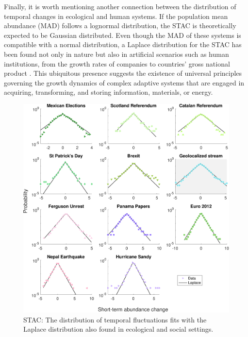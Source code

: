 Finally, it is worth mentioning another connection between the distribution of temporal changes in ecological and human systems. If the population mean abundance (MAD) follows a lognormal distribution, the STAC is theoretically expected to be Gaussian distributed. Even though the MAD of these systems is compatible with a normal distribution, a Laplace distribution for the STAC has been found not only in nature but also in artificial scenarios such as human institutions, from the growth rates of companies to countries’ gross national
product \cite{marquet2005scaling}. This ubiquitous presence suggests the existence of universal principles governing the growth dynamics of complex adaptive systems that are engaged in acquiring, transforming, and storing information, materials, or energy. \\


\begin{figure}[t]
    \centering
    \includegraphics[width=\textwidth]{figures/chp4/STAC_tweet_RemSam.pdf}
    \caption[STAC]{STAC: The distribution of temporal fluctuations fits with the Laplace distribution also found in ecological and social settings.}
    \label{fig:4:STAC}
\end{figure}


